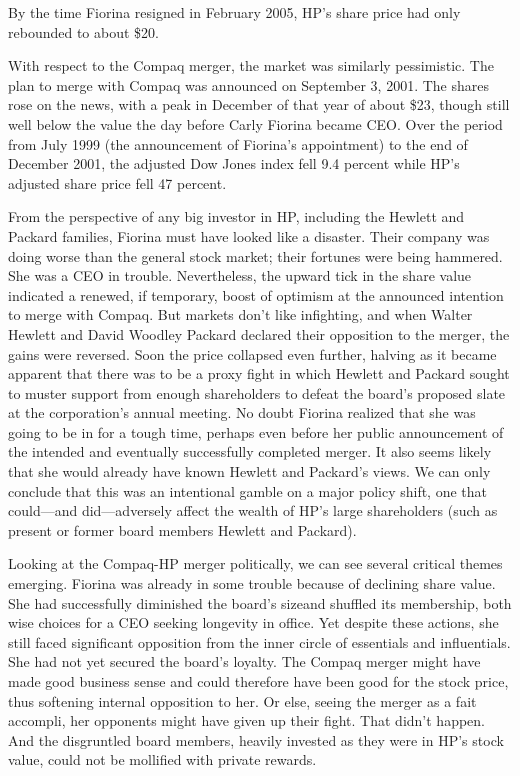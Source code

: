\documentclass[10pt]{article}
\begin{document}
{\large By the time Fiorina resigned in February 2005, HP's share price had only
rebounded to about \$20.}

{\large With respect to the Compaq merger, the market was similarly pessimistic.
The plan to merge with Compaq was announced on September 3, 2001. The shares rose
on the news, with a peak in December of that year of about \$23, though still
well below the value the day before Carly Fiorina became CEO. Over the period
from July 1999 (the announcement of Fiorina's appointment) to the end of December
2001, the adjusted Dow Jones index fell 9.4 percent while HP's adjusted share
price fell 47 percent.}

{\large From the perspective of any big investor in HP, including the Hewlett
and Packard families, Fiorina must have looked like a disaster. Their company was
doing worse than the general stock market; their fortunes were being hammered.
She was a CEO in trouble. Nevertheless, the upward tick in the share value
indicated a renewed, if temporary, boost of optimism at the announced intention
to merge with Compaq. But markets don't like infighting, and when Walter Hewlett
and David Woodley Packard declared their opposition to the merger, the gains were
reversed. Soon the price collapsed even further, halving as it became apparent
that there was to be a proxy fight in which Hewlett and Packard sought to muster
support from enough shareholders to defeat the board's proposed slate at the
corporation's annual meeting. No doubt Fiorina realized that she was going to be
in for a tough time, perhaps even before her public announcement of the intended
and eventually successfully completed merger. It also seems likely that she would
already have known Hewlett and Packard's views. We can only conclude that this
was an intentional gamble on a major policy shift, one that could---and
did---adversely affect the wealth of HP's large shareholders (such as present or
former board members Hewlett and Packard).}

{\large Looking at the Compaq-HP merger politically, we can see several critical
themes emerging. Fiorina was already in some trouble because of declining share
value. She had successfully diminished the board's sizeand shuffled its
membership, both wise choices for a CEO seeking longevity in office. Yet despite
these actions, she still faced significant opposition from the inner circle of
essentials and influentials. She had not yet secured the board's loyalty. The
Compaq merger might have made good business sense and could therefore have been
good for the stock price, thus softening internal opposition to her. Or else,
seeing the merger as a fait accompli, her opponents might have given up their
fight. That didn't happen. And the disgruntled board members, heavily invested as
they were in HP's stock value, could not be mollified with private rewards.}
\end{document}
